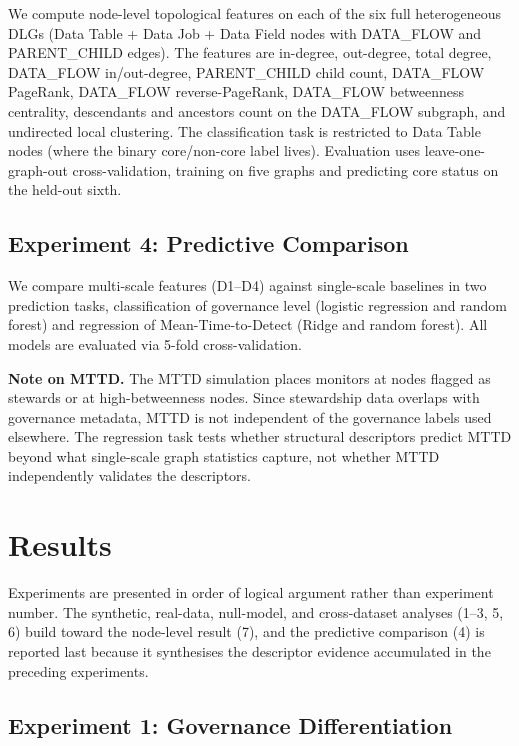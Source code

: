 \documentclass[11pt,a4paper]{article}
\begin{document}
We compute node-level topological features on each of the six full
heterogeneous DLGs (Data Table + Data Job + Data Field nodes with
DATA\_FLOW and PARENT\_CHILD edges). The features are in-degree,
out-degree, total
degree, DATA\_FLOW in/out-degree, PARENT\_CHILD child count,
DATA\_FLOW PageRank, DATA\_FLOW reverse-PageRank, DATA\_FLOW
betweenness centrality, descendants and ancestors count on the
DATA\_FLOW subgraph, and undirected local clustering. The
classification task is restricted to Data Table nodes (where the
binary core/non-core label lives). Evaluation uses leave-one-graph-out
cross-validation, training on five graphs and predicting core status on
the held-out sixth.

\subsection{Experiment 4: Predictive Comparison}

We compare multi-scale features (D1--D4) against single-scale baselines
in two prediction tasks, classification of governance level (logistic
regression and random forest) and regression of Mean-Time-to-Detect
(Ridge and random forest). All models are evaluated via 5-fold
cross-validation.

\textbf{Note on MTTD.} The MTTD simulation places monitors at nodes
flagged as stewards or at high-betweenness nodes. Since stewardship data
overlaps with governance metadata, MTTD is not independent of the
governance labels used elsewhere. The regression task tests whether
structural descriptors predict MTTD beyond what single-scale graph
statistics capture, not whether MTTD independently validates the
descriptors.

\section{Results}

Experiments are presented in order of logical argument rather than
experiment number. The synthetic, real-data, null-model, and
cross-dataset analyses (1--3, 5, 6) build toward the node-level result
(7), and the predictive comparison (4) is reported last because it
synthesises the descriptor evidence accumulated in the preceding
experiments.

\subsection{Experiment 1: Governance Differentiation}
\end{document}
